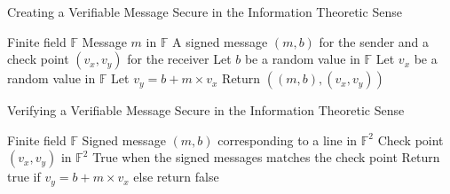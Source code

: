 \documentclass{dalcsthesis}
\begin{document}
\begin{algorithm}
  \caption{Creating a Verifiable Message Secure in the Information Theoretic Sense}
  \label{alg:CreatingVerifiableMessageForUnbounded}
  \begin{algorithmic}
    \INPUT Finite field $\mathbb{F}$
    \INPUT Message $m$ in $\mathbb{F}$
    \OUTPUT A signed message $(m, b)$ for the sender and a check point $(v_x, v_y)$ for the receiver
    \STATE Let $b$ be a random value in $\mathbb{F}$ 
    \STATE Let $v_x$ be a random value in $\mathbb{F}$
    \STATE Let $v_y = b + m \times v_x$
    \STATE Return $((m, b), (v_x, v_y))$
  \end{algorithmic}
\end{algorithm}
\begin{algorithm}
  \caption{Verifying a Verifiable Message Secure in the Information Theoretic Sense}
  \label{alg:VerifyMessageForUnbounded}
  \begin{algorithmic}
    \INPUT Finite field $\mathbb{F}$
    \INPUT Signed message $(m, b)$ corresponding to a line in $\mathbb{F}^2$
    \INPUT Check point $(v_x, v_y)$ in $\mathbb{F}^2$
    \OUTPUT True when the signed messages matches the check point
    \STATE Return true if $v_y = b + m \times v_x$ else return false
  \end{algorithmic}
\end{algorithm}
\end{document}
